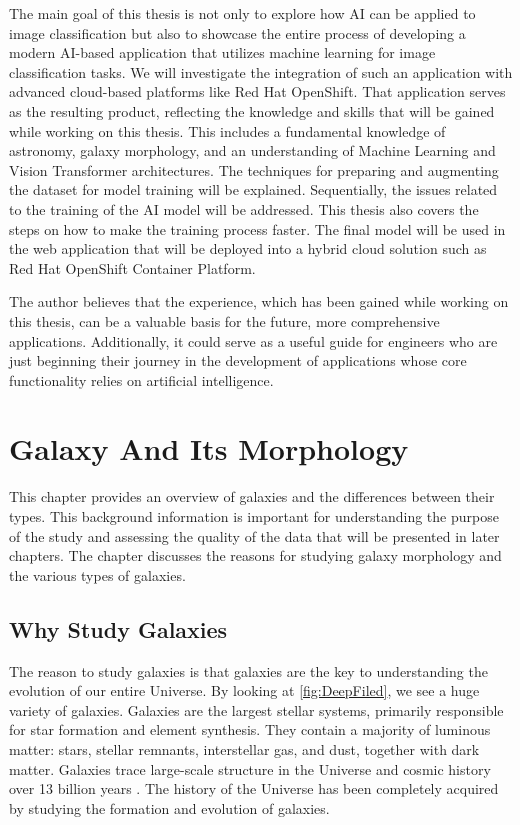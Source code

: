 The main goal of this thesis is not only to explore how AI can be applied to image classification but also to showcase the entire process of developing a modern AI-based application that utilizes machine learning for image classification tasks. We will investigate the integration of such an application with advanced cloud-based platforms like Red Hat OpenShift. That application serves as the resulting product, reflecting the knowledge and skills that will be gained while working on this thesis. This includes a fundamental knowledge of astronomy, galaxy morphology, and an understanding of Machine Learning and Vision Transformer architectures. The techniques for preparing and augmenting the dataset for model training will be explained. Sequentially, the issues related to the training of the AI model will be addressed. This thesis also covers the steps on how to make the training process faster. The final model will be used in the web application that will be deployed into a hybrid cloud solution such as Red Hat OpenShift Container Platform. 

The author believes that the experience, which has been gained while working on this thesis, can be a valuable basis for the future, more comprehensive applications. Additionally, it could serve as a useful guide for engineers who are just beginning their journey in the development of applications whose core functionality relies on artificial intelligence.


\chapter{Galaxy And Its Morphology}

This chapter provides an overview of galaxies and the differences between their types. This background information is important for understanding the purpose of the study and assessing the quality of the data that will be presented in later chapters. The chapter discusses the reasons for studying galaxy morphology and the various types of galaxies.

\section{Why Study Galaxies}

The reason to study galaxies is that galaxies are the key to understanding the evolution of our entire Universe. By looking at \autoref{fig:DeepFiled}, we see a huge variety of galaxies. Galaxies are the largest stellar systems, primarily responsible for star formation and element synthesis. They contain a majority of luminous matter: stars, stellar remnants, interstellar gas, and dust, together with dark matter. Galaxies trace large-scale structure in the Universe and cosmic history over 13 billion years \cite{Hickson2016ASTR505}. The history of the Universe has been completely acquired by studying the formation and evolution of galaxies.

